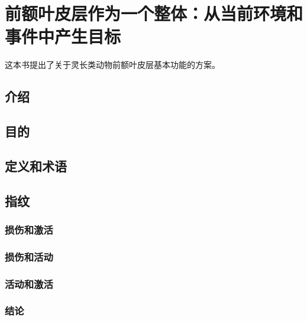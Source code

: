 \chapter{前额叶皮层作为一个整体：从当前环境和事件中产生目标}
这本书提出了关于灵长类动物前额叶皮层基本功能的方案。

\section{介绍}

\section{目的}

\section{定义和术语}


\section{指纹}

\subsection{损伤和激活}

\subsection{损伤和活动}

\subsection{活动和激活}




\subsection{结论}


